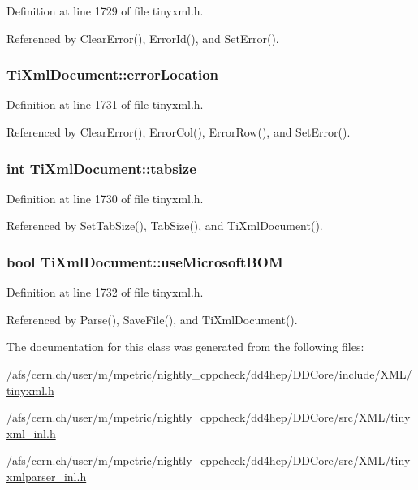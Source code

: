 Definition at line 1729 of file tinyxml.h.

Referenced by ClearError(), ErrorId(), and SetError().\hypertarget{class_ti_xml_document_aa4030f989f1549f6b897147fc2851d1a}{
\subsubsection[{errorLocation}]{ {\bf TiXmlDocument::errorLocation}}}
\label{class_ti_xml_document_aa4030f989f1549f6b897147fc2851d1a}


Definition at line 1731 of file tinyxml.h.

Referenced by ClearError(), ErrorCol(), ErrorRow(), and SetError().\hypertarget{class_ti_xml_document_af2fa6a010b903d893d52cc6fee5575a1}{
\subsubsection[{tabsize}]{\setlength{\rightskip}{0pt plus 5cm}int {\bf TiXmlDocument::tabsize}}}
\label{class_ti_xml_document_af2fa6a010b903d893d52cc6fee5575a1}


Definition at line 1730 of file tinyxml.h.

Referenced by SetTabSize(), TabSize(), and TiXmlDocument().\hypertarget{class_ti_xml_document_a4d5400dec9bfb55c640428de33297886}{
\subsubsection[{useMicrosoftBOM}]{\setlength{\rightskip}{0pt plus 5cm}bool {\bf TiXmlDocument::useMicrosoftBOM}}}
\label{class_ti_xml_document_a4d5400dec9bfb55c640428de33297886}


Definition at line 1732 of file tinyxml.h.

Referenced by Parse(), SaveFile(), and TiXmlDocument().

The documentation for this class was generated from the following files:\begin{DoxyCompactItemize}
\item 
/afs/cern.ch/user/m/mpetric/nightly\_\-cppcheck/dd4hep/DDCore/include/XML/\hyperlink{tinyxml_8h}{tinyxml.h}\item 
/afs/cern.ch/user/m/mpetric/nightly\_\-cppcheck/dd4hep/DDCore/src/XML/\hyperlink{tinyxml__inl_8h}{tinyxml\_\-inl.h}\item 
/afs/cern.ch/user/m/mpetric/nightly\_\-cppcheck/dd4hep/DDCore/src/XML/\hyperlink{tinyxmlparser__inl_8h}{tinyxmlparser\_\-inl.h}\end{DoxyCompactItemize}
